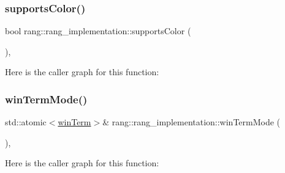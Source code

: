 \subsubsection{\texorpdfstring{supports\+Color()}{supportsColor()}}
{\footnotesize\ttfamily bool rang\+::rang\+\_\+implementation\+::supports\+Color (\begin{DoxyParamCaption}{ }\end{DoxyParamCaption})\hspace{0.3cm}{\ttfamily [inline]}, {\ttfamily [noexcept]}}

Here is the caller graph for this function\+:
\mbox{\label{namespacerang_1_1rang__implementation_a7aeef192943a09050fcb8b635b277c7a}} 
\subsubsection{\texorpdfstring{win\+Term\+Mode()}{winTermMode()}}
{\footnotesize\ttfamily std\+::atomic$<$\mbox{\hyperlink{namespacerang_af70222b38ecff8fc5aef0958d052b433}{win\+Term}}$>$\& rang\+::rang\+\_\+implementation\+::win\+Term\+Mode (\begin{DoxyParamCaption}{ }\end{DoxyParamCaption})\hspace{0.3cm}{\ttfamily [inline]}, {\ttfamily [noexcept]}}

Here is the caller graph for this function\+:

